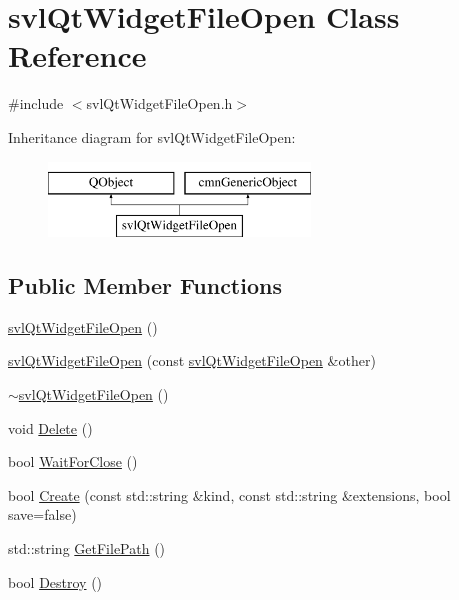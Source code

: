\hypertarget{classsvl_qt_widget_file_open}{}\section{svl\+Qt\+Widget\+File\+Open Class Reference}
\label{classsvl_qt_widget_file_open}


{\ttfamily \#include $<$svl\+Qt\+Widget\+File\+Open.\+h$>$}

Inheritance diagram for svl\+Qt\+Widget\+File\+Open\+:\begin{figure}[H]
\begin{center}
\leavevmode
\includegraphics[height=2.000000cm]{d4/d89/classsvl_qt_widget_file_open}
\end{center}
\end{figure}
\subsection*{Public Member Functions}
\begin{DoxyCompactItemize}
\item 
\hyperlink{classsvl_qt_widget_file_open_af14a2a63174b9245e9c13039ffda1a29}{svl\+Qt\+Widget\+File\+Open} ()
\item 
\hyperlink{classsvl_qt_widget_file_open_a3629a2a6fe9ba41933dc8d3f2b41d58d}{svl\+Qt\+Widget\+File\+Open} (const \hyperlink{classsvl_qt_widget_file_open}{svl\+Qt\+Widget\+File\+Open} \&other)
\item 
\hyperlink{classsvl_qt_widget_file_open_a4de4d48a0f65f50541316f37ac6b77e2}{$\sim$svl\+Qt\+Widget\+File\+Open} ()
\item 
void \hyperlink{classsvl_qt_widget_file_open_a1c19c8e342d29b80450c859742010c9f}{Delete} ()
\item 
bool \hyperlink{classsvl_qt_widget_file_open_af492c272779e06b2e60cf9d4a7e219c3}{Wait\+For\+Close} ()
\item 
bool \hyperlink{classsvl_qt_widget_file_open_a8a46efd42c1f331d17b780f79779981b}{Create} (const std\+::string \&kind, const std\+::string \&extensions, bool save=false)
\item 
std\+::string \hyperlink{classsvl_qt_widget_file_open_a69877716f9c2bfb90ddfca708684068e}{Get\+File\+Path} ()
\item 
bool \hyperlink{classsvl_qt_widget_file_open_a34cfc78e1b05536d0718586a45ed7a64}{Destroy} ()
\end{DoxyCompactItemize}
